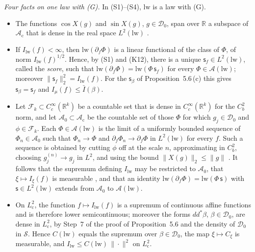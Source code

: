 \documentclass[11pt]{amsart}
\theoremstyle{definition}
\begin{document}
\emph{Four facts on one law with (G).}
In (S1)--(S4), $\mathrm{lw}$ is a law with (G).
\begin{itemize}
\item[(S1)] The functions $\cos X(g)$ and $\sin X(g)$, $g\in\mathcal D_0$, span over $\mathbb R$ a subspace of $\mathcal A_{\mathrm c}$ that is dense in the real space $L^2(\mathrm{lw})$ \cite[Lemma~8.12\,(i)]{QEDI}.
\item[(S2)] If $I_{\mathrm{lw}}(f)<\infty$, then $\mathrm{lw}(\partial_f\Phi)$ is a linear functional of the class of $\Phi$, of norm $I_{\mathrm{lw}}(f)^{1/2}$.
Hence, by (S1) and (K12), there is a unique $\mathsf s_f\in L^2(\mathrm{lw})$, called the \emph{score}, such that $\mathrm{lw}(\partial_f\Phi)=\mathrm{lw}(\Phi\,\mathsf s_f)$ for every $\Phi\in\mathcal A(\mathrm{lw})$;
moreover $\|\mathsf s_f\|_2^2=I_{\mathrm{lw}}(f)$.
For the $\mathsf s_\beta$ of Proposition~5.6\,(c) this gives $\mathsf s_\beta=\mathsf s_f$ and $I_\mu(f)\le\bar I(\beta)$.
\item[(S3)] Let $\mathcal F_k\subset C_c^\infty(\mathbb R^k)$ be a countable set that is dense in $C_c^\infty(\mathbb R^k)$ for the $C_b^2$ norm, and let $\mathcal A_0\subset\mathcal A_{\mathrm c}$ be the countable set of those $\Phi$ for which $g_j\in\mathcal D_0$ and $\phi\in\mathcal F_k$.
Each $\Phi\in\mathcal A(\mathrm{lw})$ is the limit of a uniformly bounded sequence of $\Phi_n\in\mathcal A_0$ such that $\Phi_n\to\Phi$ and $\partial_f\Phi_n\to\partial_f\Phi$ in $L^2(\mathrm{lw})$ for every $f$.
Such a sequence is obtained by cutting $\phi$ off at the scale $n$, approximating in $C^2_b$, choosing $g^{(n)}_j\to g_j$ in $L^2$, and using the bound $\|X(g)\|_2\le\|g\|$ \cite[Lemma~14.3\,(a)]{QEDII}.
It follows that the supremum defining $I_{\mathrm{lw}}$ may be restricted to $\mathcal A_0$, that $\xi\mapsto I_\xi(f)$ is measurable \cite[Proposition~45.6\,(d0)]{QEDIII}, and that an identity $\mathrm{lw}(\partial_f\Phi)=\mathrm{lw}(\Phi\,\mathsf s)$ with $\mathsf s\in L^2(\mathrm{lw})$ extends from $\mathcal A_0$ to $\mathcal A(\mathrm{lw})$.
\item[(S4)] On $L^2_{\mathrm c}$, the function $f\mapsto I_{\mathrm{lw}}(f)$ is a supremum of continuous affine functions and is therefore lower semicontinuous;
moreover the forms $dd^*\beta$, $\beta\in\mathcal D_0$, are dense in $L^2_{\mathrm c}$, by Step~7 of the proof of Proposition~5.6 and the density of $\mathcal D_0$ in $\mathcal S$.
Hence $C(\mathrm{lw})$ equals the supremum over $\beta\in\mathcal D_0$, the map $\xi\mapsto C_\xi$ is measurable, and $I_{\mathrm{lw}}\le C(\mathrm{lw})\,\|\cdot\|^2$ on $L^2_{\mathrm c}$.
\end{itemize}
\end{document}
